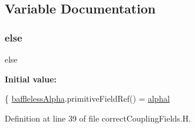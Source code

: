 \subsection{Variable Documentation}
\mbox{\label{correctCouplingFields_8H_a0544c3fe466e421738dae463968b70ba}} 
\subsubsection{\texorpdfstring{else}{else}}
{\footnotesize\ttfamily else}

{\bfseries Initial value\+:}
\begin{DoxyCode}
\{
    \hyperlink{createCouplingFields_8H_afc97dbe3594c6c5e83614b918a2c2ea5}{bafflelessAlpha}.primitiveFieldRef() = \hyperlink{correctCouplingFields_8H_ab89226dd0a6a743fc2e841f39b01cd22}{alphal}
\end{DoxyCode}


Definition at line 39 of file correct\+Coupling\+Fields.\+H.


